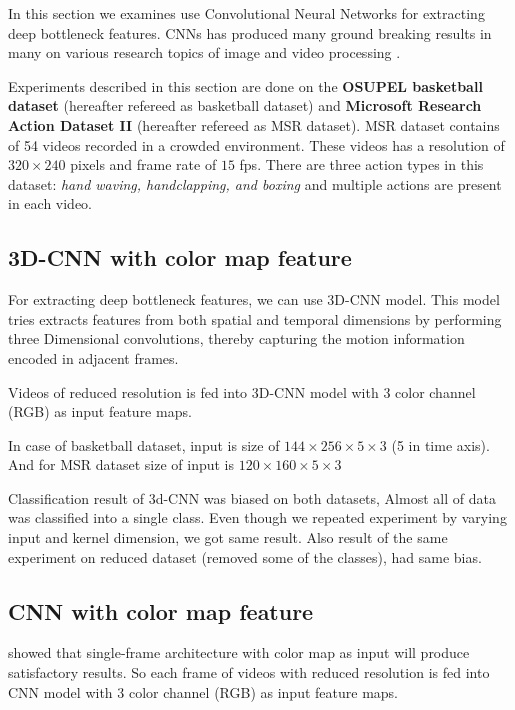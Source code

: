 In this section we examines use Convolutional Neural Networks for extracting deep bottleneck features. CNNs has produced many ground breaking results in many on various research topics of image and video processing \citep{KarpathyCVPR14, ji20133d, krizhevsky2012imagenet}. 

Experiments described in this section are done on the \textbf{OSUPEL basketball dataset} \cite{brendel2011probabilistic} (hereafter refereed as basketball dataset) and \textbf{Microsoft Research Action Dataset \RN{2}} (hereafter refereed as MSR dataset). MSR dataset contains of 54 videos recorded in a crowded environment. These videos has  a resolution of $320\times240$ pixels and frame rate of $15$ fps. There are three action types in this dataset: \textit{hand waving, handclapping, and boxing } and multiple actions are present in each video.

\subsection{3D-CNN with color map feature}
For extracting deep bottleneck features, we can use 3D-CNN model. This model tries extracts features from both spatial and temporal dimensions by performing three Dimensional convolutions, thereby capturing the motion information encoded in adjacent frames\citep{ji20133d}.

Videos of reduced resolution is fed into 3D-CNN model with 3 color channel (RGB) as input feature maps. 

In case of basketball dataset, input is size of $144 \times 256 \times 5 \times 3$ (5 in time axis). And for MSR dataset size of input is $120 \times 160 \times 5 \times 3$

Classification result of 3d-CNN was biased on both datasets, Almost all of data was classified into a single class. Even though we repeated experiment by varying input and kernel dimension, we got same result. Also result of the same experiment on reduced dataset (removed some of the classes), had same bias. 

\subsection{CNN with color map feature}
\citet{KarpathyCVPR14} showed that single-frame architecture with color map as input will produce satisfactory results. So each frame of videos with reduced resolution is fed into CNN model with 3 color channel (RGB) as input feature maps.

